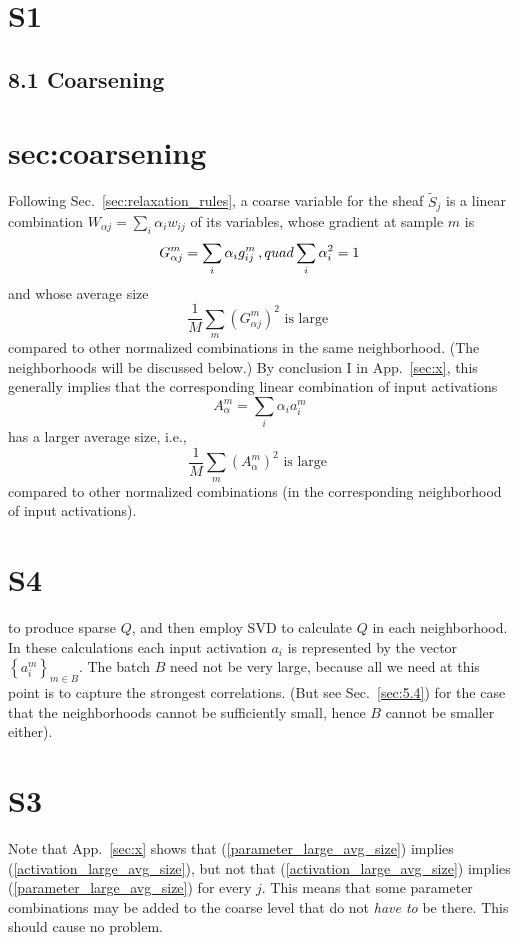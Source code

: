\documentclass{article} %
\begin{document}
\section{S1}
\subsection{8.1 Coarsening}
\section{sec:coarsening}
Following Sec.~\ref{sec:relaxation_rules}, a coarse variable for the sheaf $\tilde{S}_j$ is a linear combination $W_{\alpha j} = \sum_i \alpha_i w_{ij}$ of its variables, whose gradient at sample $m$ is
$$ G^m_{\alpha j} = \sum_i \alpha_i g^m_{ij}\,, \\quad \sum_i \alpha_i^2 = 1 $$
and whose average size
\begin{equation}
    \frac{1}{M} \sum_m \left(G^m_{\alpha j} \right)^2 \text{ is large }
    \label{parameter_large_avg_size}
\end{equation}
compared to other normalized combinations in the same neighborhood. (The neighborhoods will be discussed below.) By conclusion I in App.~\ref{sec:x}, this generally implies that the corresponding linear combination of input activations
$$A^m_{\alpha} = \sum_i \alpha_i a^m_i$$
has a larger average size, i.e.,
\begin{equation}
    \frac{1}{M} \sum_m \left(A^m_{\alpha} \right)^2 \text{ is large }
    \label{activation_large_avg_size}
\end{equation}
compared to other normalized combinations (in the corresponding neighborhood of input activations).

\section{S4}
to produce sparse $Q$, and then employ SVD to calculate $Q$ in each neighborhood. In these calculations each input activation $a_i$ is represented by the vector $\left\{ a^m_i \right\}_{m \in B}$. The batch $B$ need not be very large, because all we need at this point is to capture the strongest correlations. (But see Sec.~\ref{sec:5.4}) for the case that the neighborhoods cannot be sufficiently small, hence $B$ cannot be smaller either).

\section{S3}
Note that App.~\ref{sec:x} shows that (\ref{parameter_large_avg_size}) implies (\ref{activation_large_avg_size}), but not that (\ref{activation_large_avg_size}) implies (\ref{parameter_large_avg_size}) for every $j$. This means that some parameter combinations may be added to the coarse level that do not {\it have to} be there. This should cause no problem.
\end{document}
